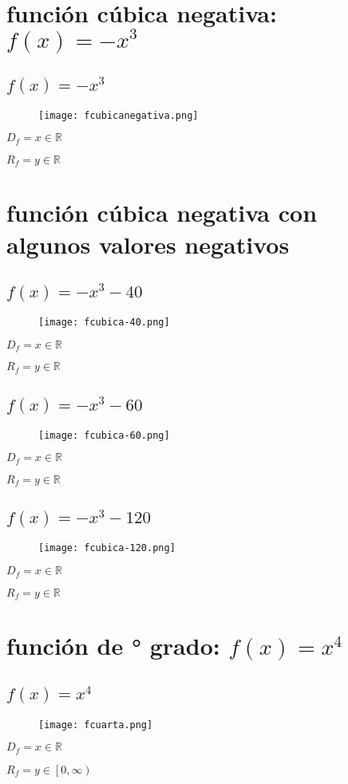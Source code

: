 \documentclass[12pt]{article}
\begin{document}
\section{función {\cyan cúbica negativa}: $f(x) = -x^3$}
\subsection{$f(x) = -x^3$}
\begin{figure}[htb] \centering \texttt{[image: fcubicanegativa.png]} 
\end{figure}
$D_f = x \in \mathbb{R}$ \par
$R_f = y \in \mathbb{R}$
\section{función {\cyan cúbica negativa} con algunos {\cyan valores negativos}}
\subsection{$f(x) = -x^3 - 40$}
\begin{figure}[htb] \centering \texttt{[image: fcubica-40.png]} 
\end{figure}
$D_f = x \in \mathbb{R}$ \par
$R_f = y \in \mathbb{R}$
\subsection{$f(x) = -x^3 - 60$}
\begin{figure}[htb] \centering \texttt{[image: fcubica-60.png]} 
\end{figure}
$D_f = x \in \mathbb{R}$ \par
$R_f = y \in \mathbb{R}$
\subsection{$f(x) = -x^3 - 120$}
\begin{figure}[htb] \centering \texttt{[image: fcubica-120.png]} 
\end{figure}
$D_f = x \in \mathbb{R}$ \par
$R_f = y \in \mathbb{R}$
\newpage
\section{función de {° grado}: $f(x) = x^4$}
\subsection{$f(x) = x^4$}
\begin{figure}[htb] \centering \texttt{[image: fcuarta.png]} 
\end{figure}
$D_f = x \in \mathbb{R}$ \par
$R_f = y \in \left[0,\infty\right)$
\end{document}

